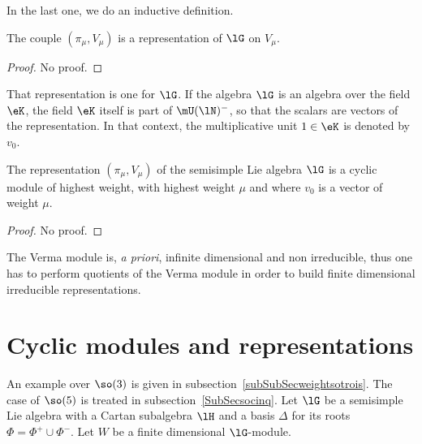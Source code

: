In the last one, we do an inductive definition.
\begin{lemma}
The couple $(\pi_{\mu},V_{\mu})$ is a representation of $\lG$ on $V_{\mu}$.
\end{lemma}
\begin{proof}
    No proof.
\end{proof}
That representation is one  for $\lG$. If the algebra $\lG$ is an algebra over the field $\eK$, the field $\eK$ itself is part of $\mU(\lN)^-$, so that the scalars are vectors of the representation. In that context, the multiplicative unit $1\in \eK$ is denoted by $v_0$.

\begin{theorem}
The representation $(\pi_{\mu},V_{\mu})$ of the semisimple Lie algebra $\lG$ is a cyclic module of highest weight, with highest weight $\mu$ and where $v_0$ is a vector of weight $\mu$.
\end{theorem}
\begin{proof}
    No proof.
\end{proof}
The Verma module is, \emph{a priori}, infinite dimensional and non irreducible, thus one has to perform quotients of the Verma module in order to build finite dimensional irreducible representations.


                    \section{Cyclic modules and representations}

An example over $\so(3)$ is given in subsection~\ref{subSubSecweightsotrois}. The case of $\so(5)$ is treated in subsection~\ref{SubSecsocinq}. Let $\lG$ be a semisimple Lie algebra with a Cartan subalgebra $\lH$ and a basis $\Delta$ for its roots $\Phi=\Phi^+\cup\Phi^-$. Let $W$ be a finite dimensional $\lG$-module.

